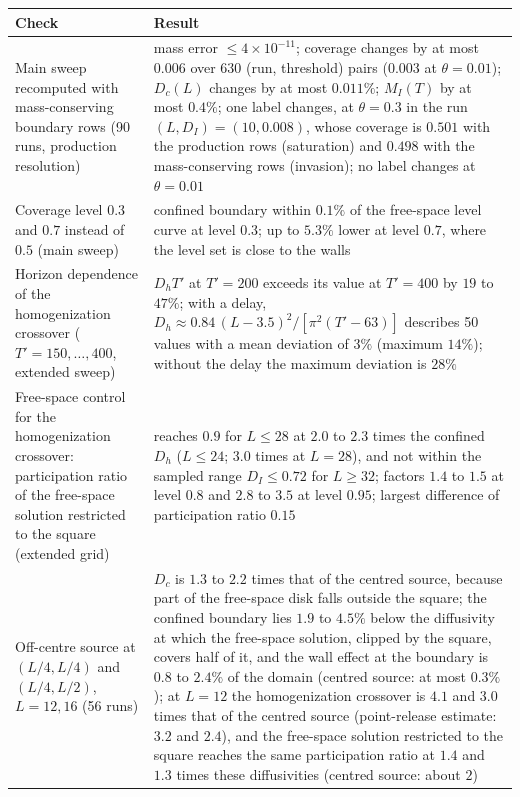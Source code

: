 \begin{tabular}{p{6.2cm}p{9.2cm}}
\toprule
Check & Result \\
\midrule
Main sweep recomputed with mass-conserving boundary rows (90 runs, production resolution) & mass error $\le 4\times 10^{-11}$; coverage changes by at most $0.006$ over 630 (run, threshold) pairs ($0.003$ at $\theta = 0.01$); $D_c(L)$ changes by at most $0.011\%$; $M_I(T)$ by at most $0.4\%$; one label changes, at $\theta = 0.3$ in the run $(L, D_I) = (10, 0.008)$, whose coverage is $0.501$ with the production rows (saturation) and $0.498$ with the mass-conserving rows (invasion); no label changes at $\theta = 0.01$ \\
\addlinespace
Coverage level $0.3$ and $0.7$ instead of $0.5$ (main sweep) & confined boundary within $0.1\%$ of the free-space level curve at level $0.3$; up to $5.3\%$ lower at level $0.7$, where the level set is close to the walls \\
\addlinespace
Horizon dependence of the homogenization crossover ($T' = 150, \dots, 400$, extended sweep) & $D_h T'$ at $T' = 200$ exceeds its value at $T' = 400$ by $19$ to $47\%$; with a delay, $D_h \approx 0.84\,(L - 3.5)^2/[\pi^2 (T' - 63)]$ describes 50 values with a mean deviation of $3\%$ (maximum $14\%$); without the delay the maximum deviation is $28\%$ \\
\addlinespace
Free-space control for the homogenization crossover: participation ratio of the free-space solution restricted to the square (extended grid) & reaches $0.9$ for $L \le 28$ at $2.0$ to $2.3$ times the confined $D_h$ ($L \le 24$; $3.0$ times at $L = 28$), and not within the sampled range $D_I \le 0.72$ for $L \ge 32$; factors $1.4$ to $1.5$ at level $0.8$ and $2.8$ to $3.5$ at level $0.95$; largest difference of participation ratio $0.15$ \\
\addlinespace
Off-centre source at $(L/4, L/4)$ and $(L/4, L/2)$, $L = 12, 16$ (56 runs) & $D_c$ is $1.3$ to $2.2$ times that of the centred source, because part of the free-space disk falls outside the square; the confined boundary lies $1.9$ to $4.5\%$ below the diffusivity at which the free-space solution, clipped by the square, covers half of it, and the wall effect at the boundary is $0.8$ to $2.4\%$ of the domain (centred source: at most $0.3\%$); at $L = 12$ the homogenization crossover is $4.1$ and $3.0$ times that of the centred source (point-release estimate: $3.2$ and $2.4$), and the free-space solution restricted to the square reaches the same participation ratio at $1.4$ and $1.3$ times these diffusivities (centred source: about $2$) \\

\end{tabular}
